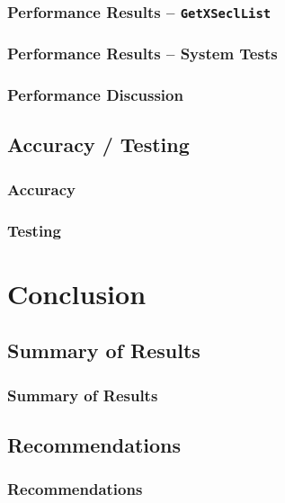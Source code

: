 \documentclass{beamer}
\begin{document}
\begin{frame}
\frametitle{Performance Results -- \texttt{GetXSeclList}}
\end{frame}

\begin{frame}
\frametitle{Performance Results -- System Tests}
\end{frame}

\begin{frame}
\frametitle{Performance Discussion}
\end{frame}

\subsection{Accuracy / Testing}
\begin{frame}
\frametitle{Accuracy}
\end{frame}

\begin{frame}
\frametitle{Testing}
\end{frame}

\section{Conclusion}
\subsection{Summary of Results}
\begin{frame}
\frametitle{Summary of Results}
\end{frame}

\subsection{Recommendations}
\begin{frame}
\frametitle{Recommendations}
\end{frame}
\end{document}

